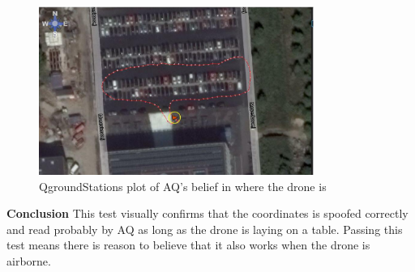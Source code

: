 \begin{figure}[H]
    \center
    \includegraphics[width=0.8\textwidth]{graphics/test_qground_plot.eps}
  \caption{QgroundStations plot of AQ's belief in where the drone is}   \label{fig:test_qground_plot}
\end{figure}

\textbf{Conclusion}
This test visually confirms that the coordinates is spoofed correctly and read probably by AQ as long as the drone is laying on a table. Passing this test means there is reason to believe that it also works when the drone is airborne.



